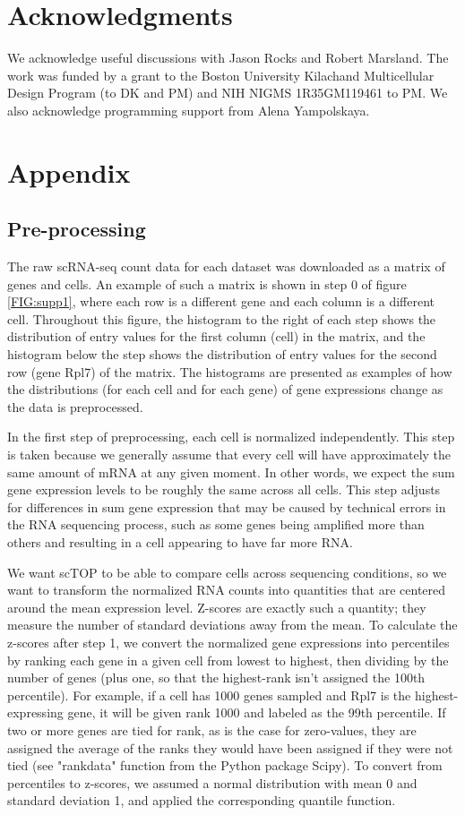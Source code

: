\documentclass[aps,superscriptaddress, notitlepage,longbibliography]{revtex4-1}
\newcommand{\beginsupplement}{%
        \setcounter{table}{0}
        \renewcommand{\thetable}{S\arabic{table}}%
        \setcounter{figure}{0}
        \renewcommand{\thefigure}{S\arabic{figure}}%
     }
\begin{document}
\section*{Acknowledgments}
We acknowledge useful discussions with Jason Rocks and Robert Marsland. The work was funded by a grant to the Boston University Kilachand Multicellular Design Program (to DK and PM) and NIH NIGMS 1R35GM119461 to PM. We also acknowledge programming support from Alena Yampolskaya.


\section*{Appendix}
\beginsupplement
\subsection{Pre-processing} \label{preprocessing}
The raw scRNA-seq count data for each dataset was downloaded as a matrix of genes and cells. An example of such a matrix is shown in step 0 of figure \ref{FIG:supp1}, where each row is a different gene and each column is a different cell. Throughout this figure, the histogram to the right of each step shows the distribution of entry values for the first column (cell) in the matrix, and the histogram below the step shows the distribution of entry values for the second row (gene Rpl7) of the matrix. The histograms are presented as examples of how the distributions (for each cell and for each gene) of gene expressions change as the data is preprocessed.

In the first step of preprocessing, each cell is normalized independently. This step is taken because we generally assume that every cell will have approximately the same amount of mRNA at any given moment. In other words, we expect the sum gene expression levels to be roughly the same across all cells. This step adjusts for differences in sum gene expression that may be caused by technical errors in the RNA sequencing process, such as some genes being amplified more than others and resulting in a cell appearing to have far more RNA. 

We want scTOP to be able to compare cells across sequencing conditions, so we want to transform the normalized RNA counts into quantities that are centered around the mean expression level. Z-scores are exactly such a quantity; they measure the number of standard deviations away from the mean. To calculate the z-scores after step 1, we convert the normalized gene expressions into percentiles by ranking each gene in a given cell from lowest to highest, then dividing by the number of genes (plus one, so that the highest-rank isn't assigned the 100th percentile). For example, if a cell has 1000 genes sampled and Rpl7 is the highest-expressing gene, it will be given rank 1000 and labeled as the 99th percentile. If two or more genes are tied for rank, as is the case for zero-values, they are assigned the average of the ranks they would have been assigned if they were not tied (see "rankdata" function from the Python package Scipy). To convert from percentiles to z-scores, we assumed a normal distribution with mean 0 and standard deviation 1, and applied the corresponding quantile function.
\end{document}
